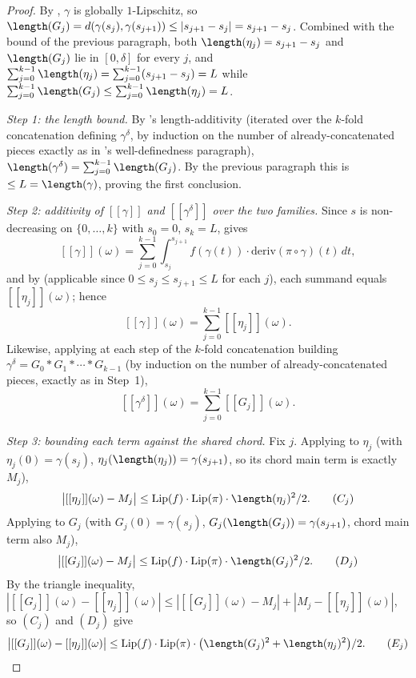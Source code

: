 \begin{proof}
  By , $\gamma$ is globally $1$-Lipschitz, so
  $\length(G_j) = d(\gamma(s_j),\gamma(s_{j+1})) \le |s_{j+1}-s_j| = s_{j+1}-s_j$. Combined with the
  bound of the previous paragraph, both $\length(\eta_j) = s_{j+1}-s_j$ and $\length(G_j)$ lie in
  $[0,\delta]$ for every $j$, and $\sum_{j=0}^{k-1}\length(\eta_j) = \sum_{j=0}^{k-1}(s_{j+1}-s_j) = L$
  while $\sum_{j=0}^{k-1}\length(G_j) \le \sum_{j=0}^{k-1}\length(\eta_j) = L$.

  \emph{Step 1: the length bound.} By 's length-additivity (iterated over the
  $k$-fold concatenation defining $\gamma^\delta$, by induction on the number of already-concatenated
  pieces exactly as in 's well-definedness paragraph),
  $\length(\gamma^\delta) = \sum_{j=0}^{k-1}\length(G_j)$. By the previous paragraph this is
  $\le L = \length(\gamma)$, proving the first conclusion.

  \emph{Step 2: additivity of $[[\gamma]]$ and $[[\gamma^\delta]]$ over the two families.} Since $s$
  is non-decreasing on $\{0,\dots,k\}$ with $s_0=0$, $s_k=L$, 
  gives
  \[
    [[\gamma]](\omega) = \sum_{j=0}^{k-1} \int_{s_j}^{s_{j+1}} f(\gamma(t))\cdot
      \mathrm{deriv}(\pi\circ\gamma)(t)\,dt
    ,
  \]
  and by  (applicable since $0\le s_j\le s_{j+1}\le L$ for each $j$),
  each summand equals $[[\eta_j]](\omega)$; hence
  \[
    [[\gamma]](\omega) = \sum_{j=0}^{k-1} [[\eta_j]](\omega)
    . \tag{A}
  \]
  Likewise, applying  at each step of the $k$-fold concatenation
  building $\gamma^\delta = G_0 * G_1 * \cdots * G_{k-1}$ (by induction on the number of
  already-concatenated pieces, exactly as in Step~1),
  \[
    [[\gamma^\delta]](\omega) = \sum_{j=0}^{k-1} [[G_j]](\omega)
    . \tag{B}
  \]

  \emph{Step 3: bounding each term against the shared chord.} Fix $j$. Applying
   to $\eta_j$ (with $\eta_j(0)=\gamma(s_j)$,
  $\eta_j(\length(\eta_j))=\gamma(s_{j+1})$, so its chord main term is exactly $M_j$),
  \[
    \bigl| [[\eta_j]](\omega) - M_j \bigr| \le \mathrm{Lip}(f)\cdot\mathrm{Lip}(\pi)\cdot
      \length(\eta_j)^2/2
    . \tag{$C_j$}
  \]
  Applying  to $G_j$ (with $G_j(0)=\gamma(s_j)$,
  $G_j(\length(G_j))=\gamma(s_{j+1})$, chord main term also $M_j$),
  \[
    \bigl| [[G_j]](\omega) - M_j \bigr| \le \mathrm{Lip}(f)\cdot\mathrm{Lip}(\pi)\cdot\length(G_j)^2/2
    . \tag{$D_j$}
  \]
  By the triangle inequality, $|[[G_j]](\omega)-[[\eta_j]](\omega)| \le |[[G_j]](\omega)-M_j| +
  |M_j - [[\eta_j]](\omega)|$, so $(C_j)$ and $(D_j)$ give
  \[
    \bigl|[[G_j]](\omega) - [[\eta_j]](\omega)\bigr|
      \le \mathrm{Lip}(f)\cdot\mathrm{Lip}(\pi)\cdot\bigl(\length(G_j)^2+\length(\eta_j)^2\bigr)/2
    . \tag{$E_j$}
  \]


\end{proof}
